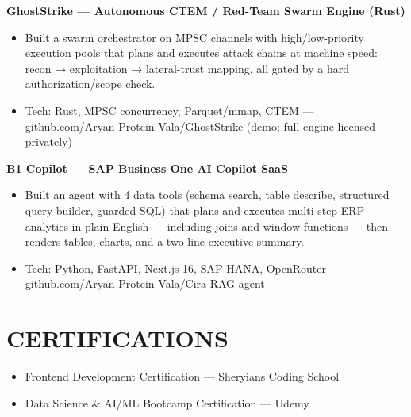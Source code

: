 \documentclass[9pt]{article}
\begin{document}
\textbf{GhostStrike  ---  Autonomous CTEM / Red-Team Swarm Engine (Rust)}
\vspace{1pt}
\begin{itemize}[leftmargin=11pt,itemsep=0pt,topsep=1pt,parsep=0pt]
\item Built a swarm orchestrator on MPSC channels with high/low-priority execution pools that plans and executes attack chains at machine speed: recon → exploitation → lateral-trust mapping, all gated by a hard authorization/scope check.
\item Tech: Rust, MPSC concurrency, Parquet/mmap, CTEM  ---  github.com/Aryan-Protein-Vala/GhostStrike (demo; full engine licensed privately)
\end{itemize}
\textbf{B1 Copilot  ---  SAP Business One AI Copilot SaaS}
\vspace{1pt}
\begin{itemize}[leftmargin=11pt,itemsep=0pt,topsep=1pt,parsep=0pt]
\item Built an agent with 4 data tools (schema search, table describe, structured query builder, guarded SQL) that plans and executes multi-step ERP analytics in plain English  ---  including joins and window functions  ---  then renders tables, charts, and a two-line executive summary.
\item Tech: Python, FastAPI, Next.js 16, SAP HANA, OpenRouter  ---  github.com/Aryan-Protein-Vala/Cira-RAG-agent
\end{itemize}
\section*{CERTIFICATIONS}
\begin{itemize}[leftmargin=11pt,itemsep=0pt,topsep=1pt,parsep=0pt]
\item Frontend Development Certification  ---  Sheryians Coding School
\item Data Science \& AI/ML Bootcamp Certification  ---  Udemy
\end{itemize}
\end{document}
